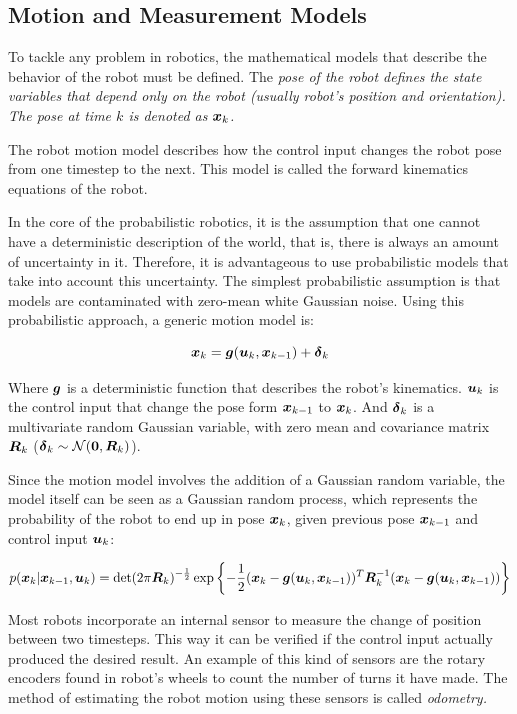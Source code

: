 \subsection{Motion and Measurement Models}

To tackle any problem in robotics, the mathematical models that describe the behavior of the robot must be defined. The \it{pose} of the robot defines the state variables that depend only on the robot (usually robot's position and orientation). The pose at time $k$ is denoted as $\boldsymbol{x}_k$. 

The robot motion model describes how the control input changes the robot pose from one timestep to the next. This model is called the forward kinematics equations of the robot.

In the core of the probabilistic robotics, it is the assumption that one cannot have a deterministic description of the world, that is, there is always an amount of uncertainty in it. Therefore, it is advantageous to use probabilistic models that take into account this uncertainty. The simplest probabilistic assumption is that models are contaminated with zero-mean white Gaussian noise. Using this probabilistic approach, a generic motion model is:

\begin{equation}
\boldsymbol{x}_k = \boldsymbol{g}(\boldsymbol{u}_k, \boldsymbol{x}_{k-1}) + \boldsymbol{\delta}_k
\label{eq:motion-model}
\end{equation}    

Where $\boldsymbol{g}$ is a deterministic function that describes the robot's kinematics. $\boldsymbol{u}_k$ is the control input that change the pose form $\boldsymbol{x}_{k-1}$ to $\boldsymbol{x}_k$. And $\boldsymbol{\delta}_k$ is a multivariate random Gaussian variable, with zero mean and covariance matrix $\boldsymbol{R}_k$ ($\boldsymbol{\delta}_k \sim \mathcal{N}(\boldsymbol{0},\boldsymbol{R}_k)$).

Since the motion model involves the addition of a Gaussian random variable, the model itself can be seen as a Gaussian random process, which represents the probability of the robot to end up in pose $\boldsymbol{x}_k$, given previous pose $\boldsymbol{x}_{k-1}$ and control input $\boldsymbol{u}_k$:

\begin{equation}
p(\boldsymbol{x}_k|\boldsymbol{x}_{k-1},\boldsymbol{u}_k) = \det(2\pi \boldsymbol{R}_k)^{-\frac{1}{2}}\exp\left\lbrace -\frac{1}{2}(\boldsymbol{x}_k-\boldsymbol{g}(\boldsymbol{u}_k,\boldsymbol{x}_{k-1}))^T
\boldsymbol{R}_k^{-1}(\boldsymbol{x}_k-\boldsymbol{g}(\boldsymbol{u}_k,\boldsymbol{x}_{k-1}))\right\rbrace
\label{eq:motion-pdf}
\end{equation}

Most robots incorporate an internal sensor to measure the change of position between two timesteps. This way it can be verified if the control input actually produced the desired result. An example of this kind of sensors are the rotary encoders found in robot's wheels to count the number of turns it have made. The method of estimating the robot motion using these sensors is called \it{odometry}. 

